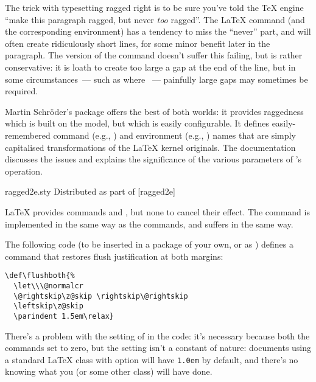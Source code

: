 
The trick with typesetting ragged right is to be sure you've told the
\TeX{} engine ``make this paragraph ragged, but never \emph{too}
ragged''.  The \LaTeX{}  command (and the
corresponding  environment) has a tendency to
miss the ``never'' part, and will often create ridiculously short
lines, for some minor benefit later in the paragraph.  The
\plaintex{} version of the command doesn't suffer this failing, but
is rather conservative: it is loath to create too large a gap at the
end of the line, but in some circumstances~--- such as where
~--- painfully large gaps
may sometimes be required.

Martin Schr\"oder's  package offers the best of both
worlds: it provides raggedness which is built on the \plaintex{}
model, but which is easily configurable.  It defines easily-remembered
command (e.g., ) and environment (e.g.,
) names that are simply capitalised
transformations of the \LaTeX{} kernel originals.  The documentation
discusses the issues and explains the significance of the various
parameters of 's operation.
\begin{ctanrefs}
\item[ragged2e.sty]Distributed as part of [ragged2e]
\end{ctanrefs}


\LaTeX{} provides commands  and , but
none to cancel their effect.  The  command is
implemented in the same way as the  commands, and suffers
in the same way.

The following code (to be inserted in a package of your own, or as
) defines a command that
restores flush justification at both margins:
\begin{verbatim}
\def\flushboth{%
  \let\\\@normalcr
  \@rightskip\z@skip \rightskip\@rightskip
  \leftskip\z@skip
  \parindent 1.5em\relax}
\end{verbatim}
There's a problem with the setting of  in the code: it's
necessary because both the  commands set  to
zero, but the setting isn't a constant of nature: documents using a
standard \LaTeX{} class with  option will have
\texttt{1.0em} by default, and there's no knowing what you (or some
other class) will have done.

